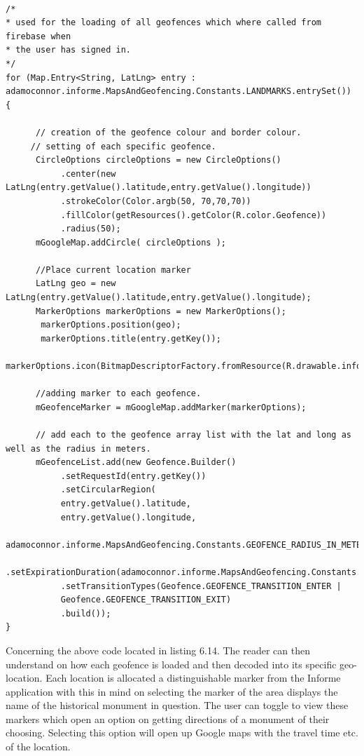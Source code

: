 \begin{lstlisting}[style=myCustomMatlabStyle, basicstyle=\small, breaklines, caption=Displaying of Geofences,captionpos=b]
 
/*
* used for the loading of all geofences which where called from firebase when
* the user has signed in.
*/
for (Map.Entry<String, LatLng> entry : adamoconnor.informe.MapsAndGeofencing.Constants.LANDMARKS.entrySet()) {
      
      // creation of the geofence colour and border colour.
     // setting of each specific geofence.
      CircleOptions circleOptions = new CircleOptions()
           .center(new LatLng(entry.getValue().latitude,entry.getValue().longitude))
           .strokeColor(Color.argb(50, 70,70,70))
           .fillColor(getResources().getColor(R.color.Geofence))
           .radius(50);
      mGoogleMap.addCircle( circleOptions );
      
      //Place current location marker
      LatLng geo = new LatLng(entry.getValue().latitude,entry.getValue().longitude);
      MarkerOptions markerOptions = new MarkerOptions();
       markerOptions.position(geo);
       markerOptions.title(entry.getKey());
       markerOptions.icon(BitmapDescriptorFactory.fromResource(R.drawable.informe));//BitmapDescriptorFactory.defaultMarker(BitmapDescriptorFactory.HUE_MAGENTA)
      
      //adding marker to each geofence.
      mGeofenceMarker = mGoogleMap.addMarker(markerOptions);
      
      // add each to the geofence array list with the lat and long as well as the radius in meters.
      mGeofenceList.add(new Geofence.Builder()
           .setRequestId(entry.getKey())
           .setCircularRegion(
           entry.getValue().latitude,
           entry.getValue().longitude,
           adamoconnor.informe.MapsAndGeofencing.Constants.GEOFENCE_RADIUS_IN_METERS)
           .setExpirationDuration(adamoconnor.informe.MapsAndGeofencing.Constants.GEOFENCE_EXPIRATION_IN_MILLISECONDS)
           .setTransitionTypes(Geofence.GEOFENCE_TRANSITION_ENTER |
           Geofence.GEOFENCE_TRANSITION_EXIT)
           .build());
}
\end{lstlisting}
\par
Concerning the above code located in listing 6.14. The reader can then understand on how each geofence is loaded and then decoded into its specific geo-location. Each location is allocated a distinguishable marker from the Informe application with this in mind on selecting the marker of the area displays the name of the historical monument in question. The user can toggle to view these markers which open an option on getting directions of a monument of their choosing. Selecting this option will open up Google maps with the travel time etc. of the location.

